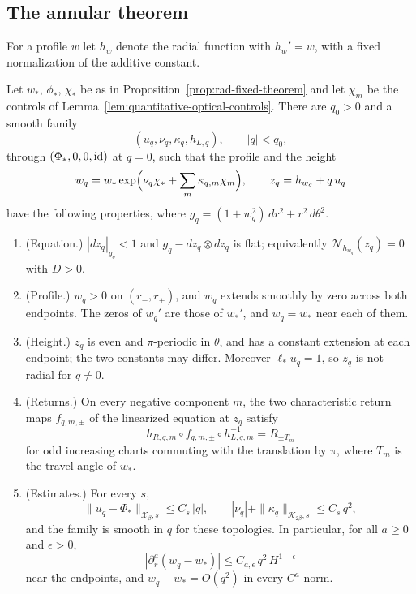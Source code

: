 \subsection{The annular theorem}

For a profile $w$ let $h_w$ denote the radial function with
$h_w'=w$, with a fixed normalization of the additive constant.

\begin{theorem}
\label{thm:new-annular-height}
Let $w_*$, $\phi_*$, $\chi_*$ be as in
Proposition~\ref{prop:rad-fixed-theorem} and let $\chi_m$ be the
controls of Lemma~\ref{lem:quantitative-optical-controls}. There are
$q_0>0$ and a smooth family
\[
 (u_q,\nu_q,\kappa_q,h_{L,q}),\qquad |q|<q_0,
\]
through $(\Phi_*,0,0,\mathrm{id})$ at $q=0$, such that the profile and the
height
\[
 w_q=w_*\exp\Bigl(\nu_q\chi_*+\sum_m\kappa_{q,m}\chi_m\Bigr),
 \qquad z_q=h_{w_q}+q\,u_q
\]
have the following properties, where
$g_q=(1+w_q^2)\,dr^2+r^2\,d\theta^2$.
\begin{enumerate}
\item \textup{(Equation.)} $|dz_q|_{g_q}<1$ and
 $g_q-dz_q\otimes dz_q$ is flat; equivalently
 $\mathcal N_{h_{w_q}}(z_q)=0$ with $D>0$.
\item \textup{(Profile.)} $w_q>0$ on $(r_-,r_+)$, and $w_q$ extends
 smoothly by zero across both endpoints. The zeros of $w_q'$ are
 those of $w_*'$, and $w_q=w_*$ near each of them.
\item \textup{(Height.)} $z_q$ is even and $\pi$-periodic in
 $\theta$, and has a constant extension at each endpoint; the two
 constants may differ. Moreover $\ell_*u_q=1$, so $z_q$ is not
 radial for $q\ne0$.
\item \textup{(Returns.)} On every negative component $m$, the two
 characteristic return maps $f_{q,m,\pm}$ of the linearized equation
 at $z_q$ satisfy
 \begin{equation}\label{eq:annular-return-condition}
  h_{R,q,m}\circ f_{q,m,\pm}\circ h_{L,q,m}^{-1}=R_{\pm T_m}
 \end{equation}
 for odd increasing charts commuting with the translation by $\pi$,
 where $T_m$ is the travel angle of $w_*$.
\item \textup{(Estimates.)} For every $s$,
 \begin{equation}\label{eq:annular-branch-estimates}
  \|u_q-\Phi_*\|_{\mathcal X_\beta,s}\le C_s\,|q|,\qquad
  |\nu_q|+\|\kappa_q\|_{\mathcal K_{2\beta},s}\le C_s\,q^2 ,
 \end{equation}
 and the family is smooth in $q$ for these topologies. In particular,
 for all $a\ge0$ and $\epsilon>0$,
 \[
  |\partial_r^a(w_q-w_*)|\le C_{a,\epsilon}\,q^2\,H^{1-\epsilon}
 \]
 near the endpoints, and $w_q-w_*=O(q^2)$ in every $C^a$ norm.
\end{enumerate}
\end{theorem}

